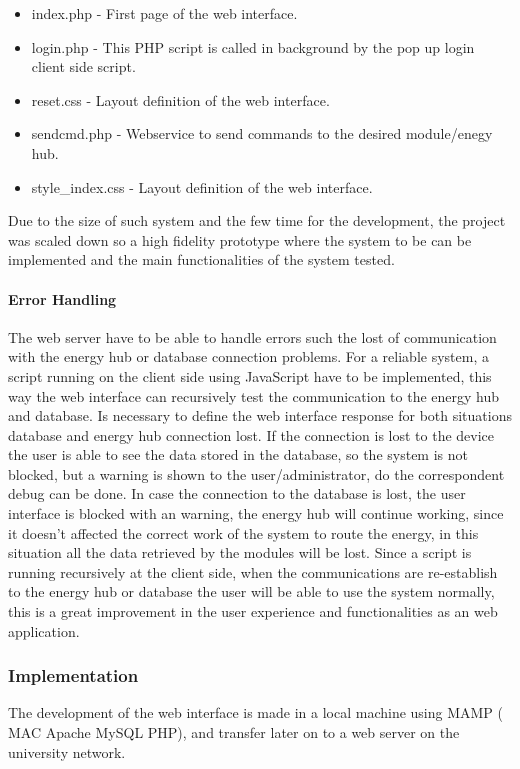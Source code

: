 \begin{itemize}
	\item index.php - First page of the web interface.
	\item login.php  - This PHP script is called in background by the pop up login client side script.
	\item reset.css - Layout definition of the web interface.
	\item sendcmd.php - Webservice to send commands to the desired module/enegy hub.
	\item style\_index.css - Layout definition of the web interface.
\end{itemize}

Due to the size of such system and the few time for the development, the project was scaled down so a high fidelity prototype where the system to be can be implemented and the main functionalities of the system tested.

\paragraph{Error Handling}
The web server have to be able to handle errors such the lost of communication with the energy hub or database connection problems. For a reliable system, a script running on the client side using JavaScript have to be implemented, this way the web interface can recursively test the communication to the energy hub and database.
\p
Is necessary to define the web interface response for both situations database and energy hub connection lost. If the connection is lost to the device the user is able to see the data stored in the database, so the system is not blocked, but a warning is shown to the user/administrator, do the correspondent debug can be done. In case the connection to the database is lost, the user interface is blocked with an warning, the energy hub will continue working, since it doesn't affected the correct work of the system to route the energy, in this situation all the data retrieved by the modules will be lost.
\p
Since a script is running recursively at the client side, when the communications are re-establish to the energy hub or database the user will be able to use the system normally, this is a great improvement in the user experience and functionalities as an web application.

\subsubsection{Implementation}
The development of the web interface is made in a local machine using MAMP ( MAC Apache MySQL PHP), and transfer later on to a web server on the university network. 


